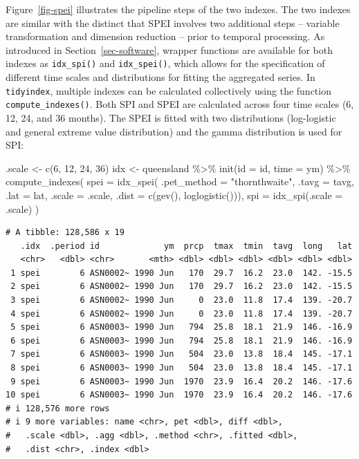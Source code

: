 \documentclass[
]{interact}
\newenvironment{Shaded}{\begin{snugshade}}{\end{snugshade}}
\newcommand{\AttributeTok}[1]{\textcolor[rgb]{0.40,0.45,0.13}{#1}}
\newcommand{\DecValTok}[1]{\textcolor[rgb]{0.68,0.00,0.00}{#1}}
\newcommand{\FunctionTok}[1]{\textcolor[rgb]{0.28,0.35,0.67}{#1}}
\newcommand{\NormalTok}[1]{\textcolor[rgb]{0.00,0.23,0.31}{#1}}
\newcommand{\OtherTok}[1]{\textcolor[rgb]{0.00,0.23,0.31}{#1}}
\newcommand{\SpecialCharTok}[1]{\textcolor[rgb]{0.37,0.37,0.37}{#1}}
\newcommand{\StringTok}[1]{\textcolor[rgb]{0.13,0.47,0.30}{#1}}
\begin{document}
Figure~\ref{fig-spei} illustrates the pipeline steps of the two indexes.
The two indexes are similar with the distinct that SPEI involves two
additional steps -- variable transformation and dimension reduction --
prior to temporal processing. As introduced in
Section~\ref{sec-software}, wrapper functions are available for both
indexes as \texttt{idx\_spi()} and \texttt{idx\_spei()}, which allows
for the specification of different time scales and distributions for
fitting the aggregated series. In \texttt{tidyindex}, multiple indexes
can be calculated collectively using the function
\texttt{compute\_indexes()}. Both SPI and SPEI are calculated across
four time scales (6, 12, 24, and 36 months). The SPEI is fitted with two
distributions (log-logistic and general extreme value distribution) and
the gamma distribution is used for SPI:

\begin{Shaded}
\begin{Highlighting}[]
\NormalTok{.scale }\OtherTok{\textless{}{-}} \FunctionTok{c}\NormalTok{(}\DecValTok{6}\NormalTok{, }\DecValTok{12}\NormalTok{, }\DecValTok{24}\NormalTok{, }\DecValTok{36}\NormalTok{)}
\NormalTok{idx }\OtherTok{\textless{}{-}}\NormalTok{ queensland }\SpecialCharTok{\%\textgreater{}\%}
  \FunctionTok{init}\NormalTok{(}\AttributeTok{id =}\NormalTok{ id, }\AttributeTok{time =}\NormalTok{ ym) }\SpecialCharTok{\%\textgreater{}\%}
  \FunctionTok{compute\_indexes}\NormalTok{(}
    \AttributeTok{spei =} \FunctionTok{idx\_spei}\NormalTok{(}
      \AttributeTok{.pet\_method =} \StringTok{"thornthwaite"}\NormalTok{, }\AttributeTok{.tavg =}\NormalTok{ tavg, }\AttributeTok{.lat =}\NormalTok{ lat, }
      \AttributeTok{.scale =}\NormalTok{ .scale, }\AttributeTok{.dist =} \FunctionTok{c}\NormalTok{(}\FunctionTok{gev}\NormalTok{(), }\FunctionTok{loglogistic}\NormalTok{())),}
    \AttributeTok{spi =} \FunctionTok{idx\_spi}\NormalTok{(}\AttributeTok{.scale =}\NormalTok{ .scale)}
\NormalTok{  )}
\end{Highlighting}
\end{Shaded}

\begin{verbatim}
# A tibble: 128,586 x 19
   .idx  .period id             ym  prcp  tmax  tmin  tavg  long   lat
   <chr>   <dbl> <chr>       <mth> <dbl> <dbl> <dbl> <dbl> <dbl> <dbl>
 1 spei        6 ASN0002~ 1990 Jun   170  29.7  16.2  23.0  142. -15.5
 2 spei        6 ASN0002~ 1990 Jun   170  29.7  16.2  23.0  142. -15.5
 3 spei        6 ASN0002~ 1990 Jun     0  23.0  11.8  17.4  139. -20.7
 4 spei        6 ASN0002~ 1990 Jun     0  23.0  11.8  17.4  139. -20.7
 5 spei        6 ASN0003~ 1990 Jun   794  25.8  18.1  21.9  146. -16.9
 6 spei        6 ASN0003~ 1990 Jun   794  25.8  18.1  21.9  146. -16.9
 7 spei        6 ASN0003~ 1990 Jun   504  23.0  13.8  18.4  145. -17.1
 8 spei        6 ASN0003~ 1990 Jun   504  23.0  13.8  18.4  145. -17.1
 9 spei        6 ASN0003~ 1990 Jun  1970  23.9  16.4  20.2  146. -17.6
10 spei        6 ASN0003~ 1990 Jun  1970  23.9  16.4  20.2  146. -17.6
# i 128,576 more rows
# i 9 more variables: name <chr>, pet <dbl>, diff <dbl>,
#   .scale <dbl>, .agg <dbl>, .method <chr>, .fitted <dbl>,
#   .dist <chr>, .index <dbl>
\end{verbatim}
\end{document}
